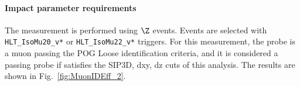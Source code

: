 \paragraph*{Impact parameter requirements}
The measurement is performed using $\Z$ events. Events are selected with \verb=HLT_IsoMu20_v*= or \verb=HLT_IsoMu22_v*= triggers.
For this measurement, the probe is a muon passing the POG Loose identification criteria,
and it is considered a passing probe if satisfies the SIP3D, dxy, dz cuts of this analysis.
%
The results are shown in Fig.~\ref{fig:MuonIDEff_2}.
